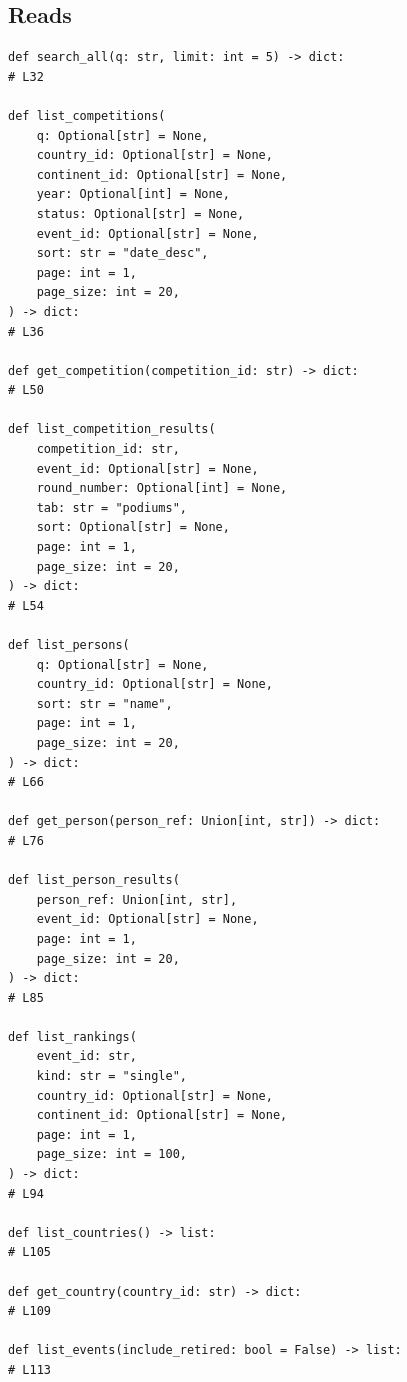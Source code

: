 \documentclass[11pt,a4paper]{article}
\begin{document}
\subsection*{Reads}
\begin{lstlisting}
def search_all(q: str, limit: int = 5) -> dict:                                 # L32

def list_competitions(
    q: Optional[str] = None,
    country_id: Optional[str] = None,
    continent_id: Optional[str] = None,
    year: Optional[int] = None,
    status: Optional[str] = None,
    event_id: Optional[str] = None,
    sort: str = "date_desc",
    page: int = 1,
    page_size: int = 20,
) -> dict:                                                                      # L36

def get_competition(competition_id: str) -> dict:                               # L50

def list_competition_results(
    competition_id: str,
    event_id: Optional[str] = None,
    round_number: Optional[int] = None,
    tab: str = "podiums",
    sort: Optional[str] = None,
    page: int = 1,
    page_size: int = 20,
) -> dict:                                                                      # L54

def list_persons(
    q: Optional[str] = None,
    country_id: Optional[str] = None,
    sort: str = "name",
    page: int = 1,
    page_size: int = 20,
) -> dict:                                                                      # L66

def get_person(person_ref: Union[int, str]) -> dict:                            # L76

def list_person_results(
    person_ref: Union[int, str],
    event_id: Optional[str] = None,
    page: int = 1,
    page_size: int = 20,
) -> dict:                                                                      # L85

def list_rankings(
    event_id: str,
    kind: str = "single",
    country_id: Optional[str] = None,
    continent_id: Optional[str] = None,
    page: int = 1,
    page_size: int = 100,
) -> dict:                                                                      # L94

def list_countries() -> list:                                                   # L105

def get_country(country_id: str) -> dict:                                       # L109

def list_events(include_retired: bool = False) -> list:                         # L113


\end{lstlisting}
\end{document}
